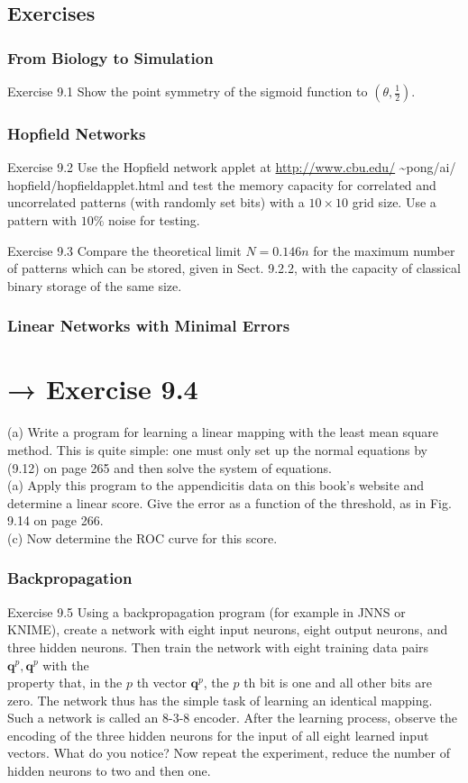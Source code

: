 \documentclass[10pt]{article}
\begin{document}
\subsection*{Exercises}
\subsubsection*{From Biology to Simulation}
Exercise 9.1 Show the point symmetry of the sigmoid function to $\left(\theta, \frac{1}{2}\right)$.

\subsubsection*{Hopfield Networks}
Exercise 9.2 Use the Hopfield network applet at \href{http://www.cbu.edu/}{http://www.cbu.edu/} \~{}pong/ai/ hopfield/hopfieldapplet.html and test the memory capacity for correlated and uncorrelated patterns (with randomly set bits) with a $10 \times 10$ grid size. Use a pattern with $10 \%$ noise for testing.

Exercise 9.3 Compare the theoretical limit $N=0.146 n$ for the maximum number of patterns which can be stored, given in Sect. 9.2.2, with the capacity of classical binary storage of the same size.

\subsubsection*{Linear Networks with Minimal Errors}
\section*{→ Exercise 9.4}
(a) Write a program for learning a linear mapping with the least mean square method. This is quite simple: one must only set up the normal equations by (9.12) on page 265 and then solve the system of equations.\\
(a) Apply this program to the appendicitis data on this book's website and determine a linear score. Give the error as a function of the threshold, as in Fig. 9.14 on page 266.\\
(c) Now determine the ROC curve for this score.

\subsubsection*{Backpropagation}
Exercise 9.5 Using a backpropagation program (for example in JNNS or KNIME), create a network with eight input neurons, eight output neurons, and three hidden neurons. Then train the network with eight training data pairs $\boldsymbol{q}^{p}, \boldsymbol{q}^{p}$ with the\\
property that, in the $p$ th vector $\boldsymbol{q}^{p}$, the $p$ th bit is one and all other bits are zero. The network thus has the simple task of learning an identical mapping. Such a network is called an 8-3-8 encoder. After the learning process, observe the encoding of the three hidden neurons for the input of all eight learned input vectors. What do you notice? Now repeat the experiment, reduce the number of hidden neurons to two and then one.
\end{document}
